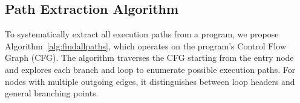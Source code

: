 




\subsection{Path Extraction Algorithm}
\label{sec:PathStore}
To systematically extract all execution paths from a program, we propose Algorithm~\ref{alg:findallpaths}, which operates on the program's Control Flow Graph (CFG).  
The algorithm traverses the CFG starting from the entry node and explores each branch and loop to enumerate possible execution paths. For nodes with multiple outgoing edges, it distinguishes between loop headers and general branching points.  

